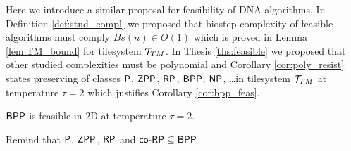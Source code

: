 	Here we introduce a similar proposal for feasibility of DNA algorithms. In Definition \ref{def:stud_compl} we proposed that biostep complexity of feasible algorithms must comply $Bs(n)\in O(1)$ which is proved in Lemma \ref{lem:TM_bound} for tilesystem ${\cal T}_{TM}$. In Thesis \ref{ths:feasible} we proposed that other studied complexities must be polynomial and Corollary \ref{cor:poly_resist} states preserving of classes $\P$, $\ZPP$, $\RP$, $\BPP$, $\NP$, \ldots in tilesystem ${\cal T}_{TM}$ at temperature $\tau=2$ which justifies Corollary \ref{cor:bpp_feas}.   %
	
	\begin{cor}
	\label{cor:bpp_feas}
		$\BPP$ is feasible in 2D at temperature $\tau=2$.
	\end{cor}
	
	\begin{note}
		Remind that $\P$, $\ZPP$, $\RP$ and $\coRP \subseteq \BPP$.
	\end{note}
	
	
	
	
	
	
	
